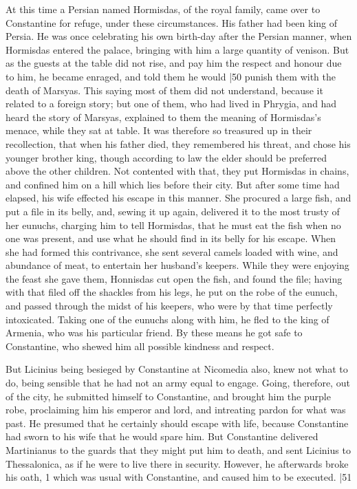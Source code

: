 At this time a Persian named Hormisdas, of the royal family, came over to Constantine for refuge, under these circumstances. His father had been king of Persia. He was once celebrating his own birth-day after the Persian manner, when Hormisdas entered the palace, bringing with him a large quantity of venison. But as the guests at the table did not rise, and pay him the respect and honour due to him, he became enraged, and told them he would
|50 punish them with the death of Marsyas. This saying most of them did not understand, because it related to a foreign story; but one of them, who had lived in Phrygia, and had heard the story of Marsyas, explained to them the meaning of Hormisdas's menace, while they sat at table. It was therefore so treasured up in their recollection, that when his father died, they remembered his threat, and chose his younger brother king, though according to law the elder should be preferred above the other children. Not contented with that, they put Hormisdas in chains, and confined him on a hill which lies before their city. But after some time had elapsed, his wife effected his escape in this manner. She procured a large fish, and put a file in its belly, and, sewing it up again, delivered it to the most trusty of her eunuchs, charging him to tell Hormisdas, that he must eat the fish when no one was present, and use what he should find in its belly for his escape. When she had formed this contrivance, she sent several camels loaded with wine, and abundance of meat, to entertain her husband's keepers. While they were enjoying the feast she gave them, Honnisdas cut open the fish, and found the file; having with that filed off the shackles from his legs, he put on the robe of the eunuch, and passed through the midst of his keepers, who were by that time perfectly intoxicated. Taking one of the eunuchs along with him, he fled to the king of Armenia, who was his particular friend. By these means he got safe to Constantine, who shewed him all possible kindness and respect.

But Licinius being besieged by Constantine at Nicomedia also, knew not what to do, being sensible that he had not an army equal to engage. Going, therefore, out of the city, he submitted himself to Constantine, and brought him the purple robe, proclaiming him his emperor and lord, and intreating pardon for what was past. He presumed that he certainly should escape with life, because Constantine had sworn to his wife that he would spare him. But Constantine delivered Martinianus to the guards that they might put him to death, and sent Licinius to Thessalonica, as if he were to live there in security. However, he afterwards broke his oath,
1 which was usual with Constantine, and caused him to be executed.
|51

